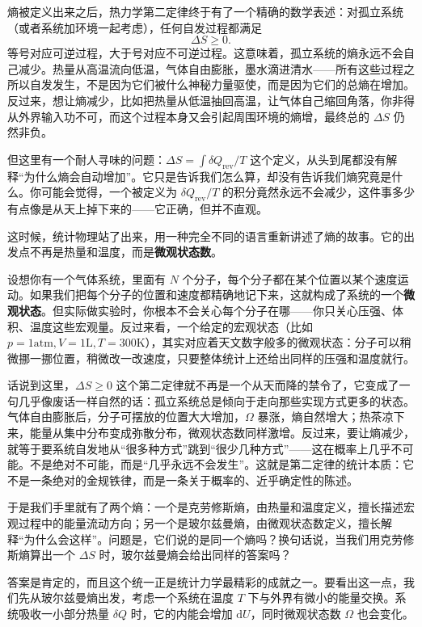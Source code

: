 \documentclass[UTF8]{ctexbook}
\begin{document}
熵被定义出来之后，热力学第二定律终于有了一个精确的数学表述：对孤立系统（或者系统加环境一起考虑），任何自发过程都满足
\[
\Delta S \ge 0.
\]
等号对应可逆过程，大于号对应不可逆过程。这意味着，孤立系统的熵永远不会自己减少。热量从高温流向低温，气体自由膨胀，墨水滴进清水——所有这些过程之所以自发发生，不是因为它们被什么神秘力量驱使，而是因为它们的总熵在增加。反过来，想让熵减少，比如把热量从低温抽回高温，让气体自己缩回角落，你非得从外界输入功不可，而这个过程本身又会引起周围环境的熵增，最终总的 $\Delta S$ 仍然非负。

但这里有一个耐人寻味的问题：$\Delta S = \int \delta Q_{\text{rev}}/T$ 这个定义，从头到尾都没有解释“为什么熵会自动增加”。它只是告诉我们怎么算，却没有告诉我们熵究竟是什么。你可能会觉得，一个被定义为 $\delta Q_{\text{rev}}/T$ 的积分竟然永远不会减少，这件事多少有点像是从天上掉下来的——它正确，但并不直观。

这时候，统计物理站了出来，用一种完全不同的语言重新讲述了熵的故事。它的出发点不再是热量和温度，而是\textbf{微观状态数}。

设想你有一个气体系统，里面有 $N$ 个分子，每个分子都在某个位置以某个速度运动。如果我们把每个分子的位置和速度都精确地记下来，这就构成了系统的一个\textbf{微观状态}。但实际做实验时，你根本不会关心每个分子在哪——你只关心压强、体积、温度这些宏观量。反过来看，一个给定的宏观状态（比如 $p=1\text{atm}, V=1\text{L}, T=300\text{K}$），其实对应着天文数字般多的微观状态：分子可以稍微挪一挪位置，稍微改一改速度，只要整体统计上还给出同样的压强和温度就行。

话说到这里，$\Delta S \ge 0$ 这个第二定律就不再是一个从天而降的禁令了，它变成了一句几乎像废话一样自然的话：孤立系统总是倾向于走向那些实现方式更多的状态。气体自由膨胀后，分子可摆放的位置大大增加，$\Omega$ 暴涨，熵自然增大；热茶凉下来，能量从集中分布变成弥散分布，微观状态数同样激增。反过来，要让熵减少，就等于要系统自发地从“很多种方式”跳到“很少几种方式”——这在概率上几乎不可能。不是绝对不可能，而是“几乎永远不会发生”。这就是第二定律的统计本质：它不是一条绝对的金规铁律，而是一条关于概率的、近乎确定性的陈述。

于是我们手里就有了两个熵：一个是克劳修斯熵，由热量和温度定义，擅长描述宏观过程中的能量流动方向；另一个是玻尔兹曼熵，由微观状态数定义，擅长解释“为什么会这样”。问题是，它们说的是同一个熵吗？换句话说，当我们用克劳修斯熵算出一个 $\Delta S$ 时，玻尔兹曼熵会给出同样的答案吗？

答案是肯定的，而且这个统一正是统计力学最精彩的成就之一。要看出这一点，我们先从玻尔兹曼熵出发，考虑一个系统在温度 $T$ 下与外界有微小的能量交换。系统吸收一小部分热量 $\delta Q$ 时，它的内能会增加 $\mathrm dU$，同时微观状态数 $\Omega$ 也会变化。
\end{document}
